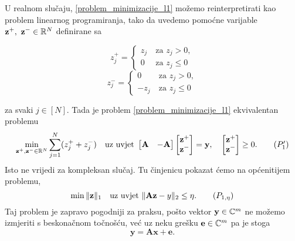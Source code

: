 \documentclass[a4paper,twoside,12pt]{memoir} %
\newcommand{\vect}[1]{\mathbf{#1}}
\renewcommand{\vec}{\vect}
\newcommand{\norm}[1]{\|{#1}\|}
\begin{document}
\indent
U realnom slu\v{c}aju, \eqref{problem_minimizacije_l1} mo\v{z}emo reinterpretirati kao problem linearnog programiranja, tako da uvedemo pomo\'cne varijable $\vec z^+,\ \vec z^- \in \R^N$ definirane sa
\begin{multicols}{2}
    \noindent
    \begin{equation*} 
        z_j^+ = 
        \begin{cases}
            z_j\ & \text{za } z_j > 0, \\
            0\ & \text{za } z_j \leq 0
        \end{cases}
    \end{equation*}
    \begin{equation*} 
        z_j^- = 
        \begin{cases}
            0\ & \text{za } z_j > 0, \\
            -z_j\ & \text{za } z_j \leq 0
        \end{cases}
    \end{equation*}
\end{multicols}
\noindent
za svaki $j \in [N]$. Tada je problem \eqref{problem_minimizacije_l1} ekvivalentan problemu
\begin{equation}
    \min_{\vec z^+,\vec z^- \\ \in \R^N} \sum_{j=1}^{N}(z_j^+ + z_j^-) \quad \text{uz uvjet }
    \begin{bmatrix*}
        \vec A & -\vec A
    \end{bmatrix*}
    \begin{bmatrix*}
        \vec z^+ \\ \vec z^-
    \end{bmatrix*}
    = \vec y, \quad
    \begin{bmatrix*}
        \vec z^+ \\ \vec z^-
    \end{bmatrix*}
    \geq 0.\tag{$P_1'$}
\end{equation}
Isto ne vrijedi za kompleksan slu\v{c}aj. Tu \v{c}injenicu pokazat \'cemo na op\'{c}enitijem problemu,
\begin{equation}\label{problem_minimizacije_l1_kvadraticni}
    \min \norm{\vec z}_1 \quad \text{uz uvjet } \norm{\vec{Az}-y}_2 \leq \eta.\tag{$P_{1,\eta}$}
\end{equation}
Taj problem je zapravo pogodniji za praksu, po\v{s}to vektor $\vec y \in \C^m$ ne mo\v{z}emo izmjeriti s beskona\v{c}nom to\v{c}no\v{s}\'cu, ve\'c uz neku gre\v{s}ku $\vec e \in \C^m$ pa je stoga
\begin{equation*}
    \vec y = \vec{Ax} + \vec e. 
\end{equation*}
\end{document}
